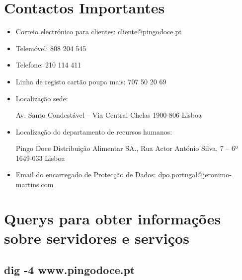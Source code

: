 \section{Contactos Importantes}
\begin{itemize}
\item Correio electrónico para clientes: cliente@pingodoce.pt\newline


\item Telemóvel: 808 204 545 \newline


\item Telefone:    210 114 411\newline


\item Linha de registo cartão poupa mais: 707 50 20 69\newline

\item Localização sede:\newline


\par Av. Santo Condestável – Via Central Chelas 1900-806 Lisboa\newline


\item Localização do departamento de recursos humanos: \newline


\par Pingo Doce Distribuição Alimentar SA., Rua Actor António Silva, 7 – 6º 1649-033 Lisboa \newline


\item Email do encarregado de Protecção de Dados:  dpo.portugal@jeronimo-martins.com \newline
\end{itemize}


\section{Querys para obter informações sobre servidores e serviços}

\subsection{dig -4 www.pingodoce.pt}

